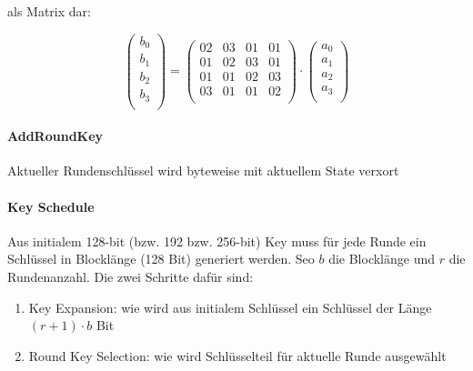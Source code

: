     als Matrix dar:

\begin{equation*}
    \begin{pmatrix}
        b_0 \\ b_1 \\ b_2 \\ b_3 \\
\end{pmatrix}  = \begin{pmatrix}
        02 & 03 & 01 & 01 \\
        01 & 02 & 03 & 01 \\
        01 & 01 & 02 & 03 \\
        03 & 01 & 01 & 02 \\
\end{pmatrix} \cdot \begin{pmatrix}
        a_0 \\ a_1 \\ a_2 \\ a_3 \\
\end{pmatrix} 
\end{equation*}

\paragraph{AddRoundKey}

Aktueller Rundenschlüssel wird byteweise mit aktuellem State verxort

\paragraph{Key Schedule}

Aus initialem 128-bit (bzw. 192 bzw. 256-bit) Key muss für jede
Runde ein Schlüssel in Blocklänge (128 Bit) generiert werden. Seo $b$ die Blocklänge und $r$ die Rundenanzahl.
Die zwei Schritte dafür sind:

\begin{enumerate}
    \item Key Expansion: wie wird aus initialem Schlüssel ein Schlüssel der Länge $(r + 1) \cdot b$ Bit
    \item Round Key Selection: wie wird Schlüsselteil für aktuelle Runde ausgewählt
\end{enumerate}


